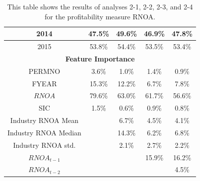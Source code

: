 {{\begin{table}[]
{\begin{tabular}{ccccc}
\multicolumn{1}{|c|}{2014}                 & \multicolumn{1}{c|}{47.5\%}       & \multicolumn{1}{c|}{49.6\%}       & \multicolumn{1}{c|}{46.9\%}       & \multicolumn{1}{c|}{47.8\%}       \\ \hline
\multicolumn{1}{|c|}{2015}                 & \multicolumn{1}{c|}{53.8\%}       & \multicolumn{1}{c|}{54.4\%}       & \multicolumn{1}{c|}{53.5\%}       & \multicolumn{1}{c|}{53.4\%}       \\ \hline
\multicolumn{5}{|c|}{\textbf{Feature Importance}}                                                                                                                                          \\ \hline
\multicolumn{1}{|c|}{PERMNO}               & \multicolumn{1}{c|}{3.6\%}        & \multicolumn{1}{c|}{1.0\%}        & \multicolumn{1}{c|}{1.4\%}        & \multicolumn{1}{c|}{0.9\%}        \\ \hline
\multicolumn{1}{|c|}{FYEAR}                & \multicolumn{1}{c|}{15.3\%}       & \multicolumn{1}{c|}{12.2\%}       & \multicolumn{1}{c|}{6.7\%}        & \multicolumn{1}{c|}{7.8\%}        \\ \hline
\multicolumn{1}{|c|}{$RNOA$}               & \multicolumn{1}{c|}{79.6\%}       & \multicolumn{1}{c|}{63.0\%}       & \multicolumn{1}{c|}{61.7\%}       & \multicolumn{1}{c|}{56.6\%}       \\ \hline
\multicolumn{1}{|c|}{SIC}                  & \multicolumn{1}{c|}{1.5\%}        & \multicolumn{1}{c|}{0.6\%}        & \multicolumn{1}{c|}{0.9\%}        & \multicolumn{1}{c|}{0.8\%}        \\ \hline
\multicolumn{1}{|c|}{Industry RNOA Mean}   & \multicolumn{1}{c|}{}             & \multicolumn{1}{c|}{6.7\%}        & \multicolumn{1}{c|}{4.5\%}        & \multicolumn{1}{c|}{4.1\%}        \\ \hline
\multicolumn{1}{|c|}{Industry RNOA Median} & \multicolumn{1}{c|}{}             & \multicolumn{1}{c|}{14.3\%}       & \multicolumn{1}{c|}{6.2\%}        & \multicolumn{1}{c|}{6.8\%}        \\ \hline
\multicolumn{1}{|c|}{Industry RNOA std.}   & \multicolumn{1}{c|}{}             & \multicolumn{1}{c|}{2.1\%}        & \multicolumn{1}{c|}{2.7\%}        & \multicolumn{1}{c|}{2.2\%}        \\ \hline
\multicolumn{1}{|c|}{$RNOA_{t-1}$}         & \multicolumn{1}{c|}{}             & \multicolumn{1}{c|}{}             & \multicolumn{1}{c|}{15.9\%}       & \multicolumn{1}{c|}{16.2\%}       \\ \hline
\multicolumn{1}{|c|}{$RNOA_{t-2}$}         & \multicolumn{1}{c|}{}             & \multicolumn{1}{c|}{}             & \multicolumn{1}{c|}{}             & \multicolumn{1}{c|}{4.5\%}        \\ \hline
\end{tabular}}
\caption{This table shows the results of analyses 2-1, 2-2, 2-3, and 2-4  for the profitability measure RNOA.}
\label{tab:RNOA-2}
\end{table}

}}
